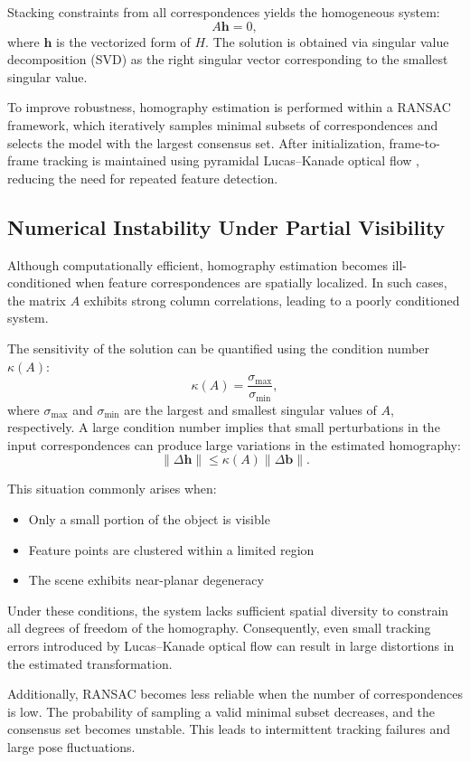Stacking constraints from all correspondences yields the homogeneous system:
\[
A \mathbf{h} = 0,
\]
where $\mathbf{h}$ is the vectorized form of $H$. The solution is obtained via singular value decomposition (SVD) as the right singular vector corresponding to the smallest singular value.

To improve robustness, homography estimation is performed within a RANSAC framework, which iteratively samples minimal subsets of correspondences and selects the model with the largest consensus set. After initialization, frame-to-frame tracking is maintained using pyramidal Lucas--Kanade optical flow \cite{lucaskanade1981}, reducing the need for repeated feature detection.

\subsection{Numerical Instability Under Partial Visibility}

Although computationally efficient, homography estimation becomes ill-conditioned when feature correspondences are spatially localized. In such cases, the matrix $A$ exhibits strong column correlations, leading to a poorly conditioned system.

The sensitivity of the solution can be quantified using the condition number $\kappa(A)$:
\[
\kappa(A) = \frac{\sigma_{\max}}{\sigma_{\min}},
\]
where $\sigma_{\max}$ and $\sigma_{\min}$ are the largest and smallest singular values of $A$, respectively. A large condition number implies that small perturbations in the input correspondences can produce large variations in the estimated homography:
\[
\|\Delta \mathbf{h}\| \leq \kappa(A)\|\Delta \mathbf{b}\|.
\]

This situation commonly arises when:
\begin{itemize}
    \item Only a small portion of the object is visible
    \item Feature points are clustered within a limited region
    \item The scene exhibits near-planar degeneracy
\end{itemize}

Under these conditions, the system lacks sufficient spatial diversity to constrain all degrees of freedom of the homography. Consequently, even small tracking errors introduced by Lucas--Kanade optical flow can result in large distortions in the estimated transformation.

Additionally, RANSAC becomes less reliable when the number of correspondences is low. The probability of sampling a valid minimal subset decreases, and the consensus set becomes unstable. This leads to intermittent tracking failures and large pose fluctuations.


